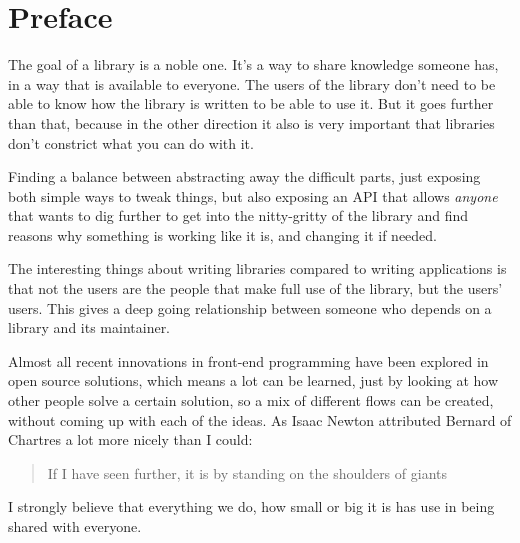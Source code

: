 
\chapter{Preface}%
\label{chp:preface}

The goal of a library is a noble one. It's a way to share knowledge someone has, in a way that is available to everyone. The users of the library don't need to be able to know how the library is written to be able to use it. But it goes further than that, because in the other direction it also is very important that libraries don't constrict what you can do with it.

Finding a balance between abstracting away the difficult parts, just exposing both simple ways to tweak things, but also exposing an API that allows \emph{anyone} that wants to dig further to get into the nitty-gritty of the library and find reasons why something is working like it is, and changing it if needed.

The interesting things about writing libraries compared to writing applications is that not the users are the people that make full use of the library, but the users' users. This gives a deep going relationship between someone who depends on a library and its maintainer.

Almost all recent innovations in front-end programming have been explored in open source solutions, which means a lot can be learned, just by looking at how other people solve a certain solution, so a mix of different flows can be created, without coming up with each of the ideas. As Isaac Newton attributed Bernard of Chartres a lot more nicely than I could: 

\begin{quotation}
  If I have seen further, it is by standing on the shoulders of giants
\end{quotation}

I strongly believe that everything we do, how small or big it is has use in being shared with everyone. 
